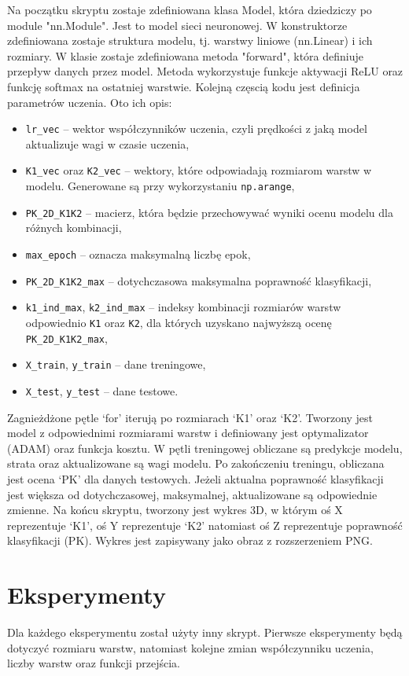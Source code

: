 \documentclass{article}
\begin{document}
Na początku skryptu zostaje zdefiniowana klasa Model, która dziedziczy po module "nn.Module".
Jest to model sieci neuronowej.
W konstruktorze zdefiniowana zostaje struktura modelu, tj. warstwy liniowe (nn.Linear) i ich rozmiary.
W klasie zostaje zdefiniowana metoda "forward", która definiuje przepływ danych przez model.
Metoda wykorzystuje funkcje aktywacji ReLU oraz funkcję softmax na ostatniej warstwie.
Kolejną częscią kodu jest definicja parametrów uczenia.
Oto ich opis:
\begin{itemize}
    \item \texttt{lr\_vec} -- wektor współczynników uczenia, czyli prędkości z jaką model aktualizuje wagi w czasie uczenia,
    \item \texttt{K1\_vec} oraz \texttt{K2\_vec} -- wektory, które odpowiadają rozmiarom warstw w modelu. Generowane są przy wykorzystaniu \texttt{np.arange},
    \item \texttt{PK\_2D\_K1K2} -- macierz, która będzie przechowywać wyniki ocenu modelu dla różnych kombinacji,
    \item \texttt{max\_epoch} -- oznacza maksymalną liczbę epok,
    \item \texttt{PK\_2D\_K1K2\_max} -- dotychczasowa maksymalna poprawność klasyfikacji,
    \item \texttt{k1\_ind\_max}, \texttt{k2\_ind\_max} -- indeksy kombinacji rozmiarów warstw odpowiednio \texttt{K1} oraz \texttt{K2}, dla których uzyskano najwyższą ocenę \texttt{PK\_2D\_K1K2\_max},
    \item \texttt{X\_train}, \texttt{y\_train} -- dane treningowe,
    \item \texttt{X\_test}, \texttt{y\_test} -- dane testowe.
\end{itemize}
Zagnieżdżone pętle `for' iterują po rozmiarach `K1' oraz `K2'. Tworzony jest model z odpowiednimi rozmiarami warstw i definiowany jest optymalizator (ADAM) oraz funkcja kosztu.
W pętli treningowej obliczane są predykcje modelu, strata oraz aktualizowane są wagi modelu.
Po zakończeniu treningu, obliczana jest ocena `PK' dla danych testowych.
Jeżeli aktualna poprawność klasyfikacji jest większa od dotychczasowej, maksymalnej, aktualizowane są odpowiednie zmienne.
Na końcu skryptu, tworzony jest wykres 3D, w którym oś X reprezentuje `K1', oś Y reprezentuje `K2' natomiast oś Z reprezentuje poprawność klasyfikacji (PK).
Wykres jest zapisywany jako obraz z rozszerzeniem PNG.


\section{Eksperymenty}
Dla każdego eksperymentu został użyty inny skrypt.
Pierwsze eksperymenty będą dotyczyć rozmiaru warstw, natomiast kolejne zmian współczynniku uczenia, liczby warstw oraz funkcji przejścia.
\end{document}
